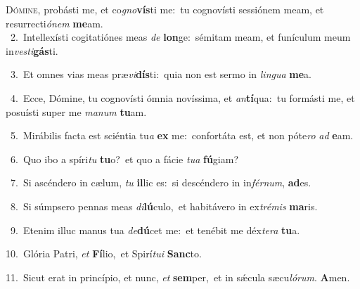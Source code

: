 \lettrine{\initial\textcolor{\initialcolor}{D}}{ómine,} probásti me, et co\-\textit{gno}\-\textbf{vís}ti me:~\star tu cognovísti sessiónem meam, et resurrecti\-\textit{ó}\-\textit{nem} \textbf{me}\-am.\\
{\numbfont\textcolor{\numbcolor}{~2.}}~Intellexísti cogitatiónes meas \textit{de} \textbf{lon}\-ge:~\star sémitam meam, et funículum meum in\-\textit{ves}\-\textit{ti}\textbf{gás}ti.\par
{\numbfont\textcolor{\numbcolor}{~3.}}~Et omnes vias meas præ\-\textit{vi}\-\textbf{dís}ti:~\star quia non est sermo in \textit{lin}\-\textit{gua} \textbf{me}\-a.\par
{\numbfont\textcolor{\numbcolor}{~4.}}~Ecce, Dómine, tu cognovísti ómnia novíssima, et \textit{an}\-\textbf{tí}qua:~\star tu formásti me, et posuísti super me \textit{ma}\-\textit{num} \textbf{tu}\-am.\par
{\numbfont\textcolor{\numbcolor}{~5.}}~Mirábilis facta est sciéntia tu\textit{a} \textbf{ex} me:~\star confortáta est, et non póte\textit{ro} \textit{ad} \textbf{e}\-am.\par
{\numbfont\textcolor{\numbcolor}{~6.}}~Quo ibo a spíri\textit{tu} \textbf{tu}\-o?~\star et quo a fácie \textit{tu}\-\textit{a} \textbf{fú}\-giam?\par
{\numbfont\textcolor{\numbcolor}{~7.}}~Si ascéndero in cælum, \textit{tu} \textbf{il}\-lic es:~\star si descéndero in in\-\textit{fér}\-\textit{num}, \textbf{ad}\-es.\par
{\numbfont\textcolor{\numbcolor}{~8.}}~Si súmpsero pennas meas \textit{di}\-\textbf{lú}culo,~\star et habitávero in ex\-\textit{tré}\-\textit{mis} \textbf{ma}\-ris.\par
{\numbfont\textcolor{\numbcolor}{~9.}}~Etenim illuc manus tua \textit{de}\-\textbf{dú}cet me:~\star et tenébit me déx\-\textit{te}\-\textit{ra} \textbf{tu}\-a.\par
{\numbfont\textcolor{\numbcolor}{10.}}~Glória Patri, \textit{et} \textbf{Fí}\-lio,~\star et Spirí\-\textit{tu}\-\textit{i} \textbf{Sanc}\-to.\par
{\numbfont\textcolor{\numbcolor}{11.}}~Sicut erat in princípio, et nunc, \textit{et} \textbf{sem}\-per,~\star et in sǽcula sæcu\-\textit{ló}\-\textit{rum}. \textbf{A}\-men.\par
